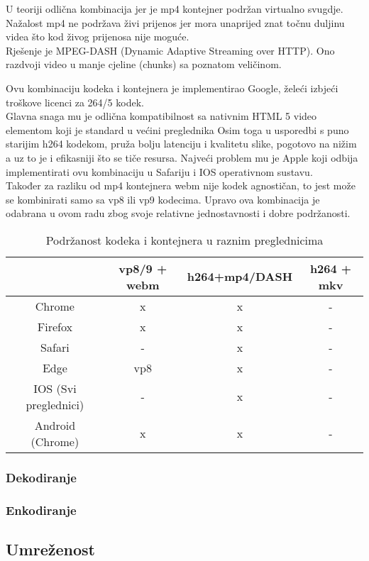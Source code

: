 U teoriji odlična kombinacija jer je mp4 kontejner podržan virtualno svugdje.
\paraBreak
Nažalost mp4 ne podržava živi prijenos jer mora unaprijed znat točnu duljinu videa što kod živog prijenosa nije moguće. \\
Rješenje je MPEG-DASH (Dynamic Adaptive Streaming over HTTP). Ono razdvoji video u manje cjeline (chunks) sa poznatom veličinom.

Ovu kombinaciju kodeka i kontejnera je implementirao Google, želeći izbjeći troškove licenci za 264/5 kodek. \\
Glavna snaga mu je odlična kompatibilnost sa nativnim HTML 5 video elementom koji je standard u većini preglednika
\paraBreak
Osim toga u usporedbi s puno starijim h264 kodekom, pruža bolju latenciju i kvalitetu slike, pogotovo na nižim  a uz to je
i efikasniji što se tiče resursa.
\paraBreak
Najveći problem mu je Apple koji odbija implementirati ovu kombinaciju u Safariju i IOS operativnom sustavu. \\
Također za razliku od mp4 kontejnera webm nije kodek agnostičan, to jest može se kombinirati samo sa vp8 ili vp9 kodecima.
\paraBreak
Upravo ova kombinacija je odabrana u ovom radu zbog svoje relativne jednostavnosti i dobre podržanosti.

\begin{center}
  \begin{table}[h]
  \begin{tabular}{|c|c|c|c|}
    \hline
      & vp8/9 + webm & h264+mp4/DASH & h264 + mkv \\
    \hline
    Chrome & x & x & - \\
    Firefox & x & x & - \\
    Safari & - & x & - \\
    Edge & vp8 & x & - \\
    IOS (Svi preglednici) & - & x & - \\
    Android (Chrome) & x & x & - \\
    \hline
  \end{tabular}
  \caption{Podržanost kodeka i kontejnera u raznim preglednicima}
\end{table}

\end{center}


\subsubsection{Dekodiranje}
\subsubsection{Enkodiranje}

\clearpage
\subsection{Umreženost}
